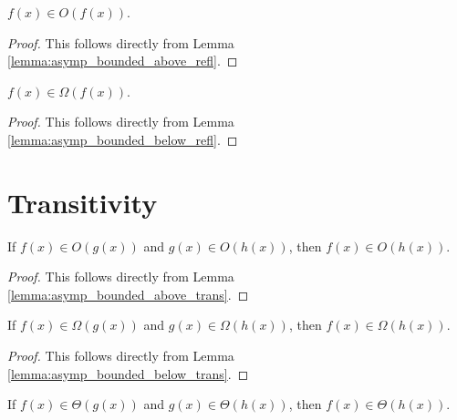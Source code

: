 \begin{lemma}
    \label{lemma:big_o_refl}
    \leanok
    $f(x) \in O(f(x))$.
\end{lemma}

\begin{proof}
    \leanok
    This follows directly from Lemma \ref{lemma:asymp_bounded_above_refl}.
\end{proof}

\begin{lemma}
    \label{lemma:big_omega_refl}
    \leanok
    $f(x) \in \Omega(f(x))$.
\end{lemma}

\begin{proof}
    \leanok
    This follows directly from Lemma \ref{lemma:asymp_bounded_below_refl}.
\end{proof}


\section{Transitivity}

\begin{lemma}
    \label{lemma:big_o_trans}
    \leanok
    If $f(x) \in O(g(x))$ and $g(x) \in O(h(x))$, then $f(x) \in O(h(x))$.
\end{lemma}

\begin{proof}
    \leanok
    This follows directly from Lemma \ref{lemma:asymp_bounded_above_trans}.
\end{proof}

\begin{lemma}
    \label{lemma:big_omega_trans}
    \leanok
    If $f(x) \in \Omega(g(x))$ and $g(x) \in \Omega(h(x))$, then $f(x) \in \Omega(h(x))$.
\end{lemma}

\begin{proof}
    \leanok
    This follows directly from Lemma \ref{lemma:asymp_bounded_below_trans}.
\end{proof}

\begin{lemma}
    \label{lemma:theta_trans}
    \leanok
    If $f(x) \in \Theta(g(x))$ and $g(x) \in \Theta(h(x))$, then $f(x) \in \Theta(h(x))$.
\end{lemma}

